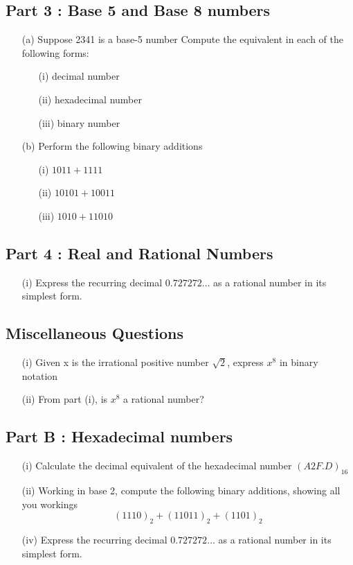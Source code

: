 \subsection*{Part 3 : Base 5 and Base 8 numbers}
\begin{itemize}
	\item[(a)] Suppose 2341 is a base-5 number
	Compute the equivalent in each of the following forms:
	\begin{itemize}
		\item[(i)] decimal number
		\item[(ii)] hexadecimal number
		\item[(iii)] binary number
	\end{itemize}
	\item[(b)] Perform the following binary additions
	\begin{itemize}
		\item[(i)] $1011+ 1111$
		\item[(ii)] $10101  + 10011$
		\item[(iii)] $1010 + 11010$
	\end{itemize}
\end{itemize}

\subsection*{Part 4 : Real and Rational Numbers}
\begin{itemize}
	\item[(i)] Express the recurring decimal $0.727272\ldots$ as a rational number in its simplest form.
\end{itemize}
\subsection*{Miscellaneous Questions}
\begin{itemize}
	\item[(i)] Given x is the irrational positive number $\sqrt{2}$, express $x^8$ in binary notation\\
	\item[(ii)] From part (i), is $x^8$ a rational number?
\end{itemize}
\newpage

\subsection*{Part B :  Hexadecimal numbers}
\begin{itemize}
\item[(i)] Calculate the decimal equivalent of the hexadecimal number $(A2F.D)_{16}$
\item[(ii)] Working in base 2, compute the following binary additions, showing all you workings
\[(1110)_2 + (11011)_2 + (1101)_2 \]
\item[(iv)] Express the recurring decimal $0.727272\ldots$ as a rational number in its simplest form.
\end{itemize}


